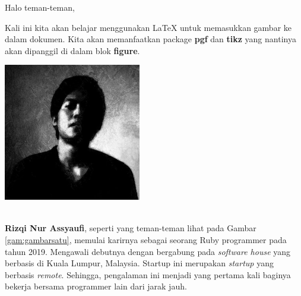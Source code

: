 \documentclass[12pt, times new roman]{article}
\begin{document}
Halo teman-teman,

Kali ini kita akan belajar menggunakan LaTeX untuk memasukkan gambar ke dalam dokumen. Kita akan memanfaatkan package \textbf{pgf} dan \textbf{tikz} yang nantinya akan dipanggil di dalam blok \textbf{figure}.\\

\begin{minipage}{\linewidth}
  \centering
  \includegraphics[width=6cm]{photo_diri.jpg}
  \label{gam:gambarsatu}
\end{minipage}\\

\textbf{Rizqi Nur Assyaufi}, seperti yang teman-teman lihat pada Gambar \ref{gam:gambarsatu}, memulai karirnya sebagai seorang Ruby programmer pada tahun 2019. Mengawali debutnya dengan bergabung pada \textit{software house} yang berbasis di Kuala Lumpur, Malaysia. Startup ini merupakan \textit{startup} yang berbasis \textit{remote}. Sehingga, pengalaman ini menjadi yang pertama kali baginya bekerja bersama programmer lain dari jarak jauh.
\end{document}
